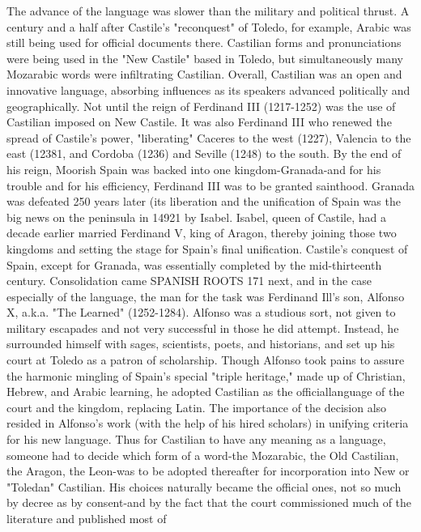 The advance of the language was slower than the military and
political thrust. A century and a half after Castile's "reconquest" of Toledo, for example, Arabic was still being used for official documents
there. Castilian forms and pronunciations were being used in the "New
Castile" based in Toledo, but simultaneously many Mozarabic words
were infiltrating Castilian. Overall, Castilian was an open and innovative language, absorbing influences as its speakers advanced politically
and geographically.
Not until the reign of Ferdinand III (1217-1252) was the use
of Castilian imposed on New Castile. It was also Ferdinand III who renewed the spread of Castile's power, "liberating" Caceres to the west
(1227), Valencia to the east (12381, and Cordoba (1236) and Seville
(1248) to the south. By the end of his reign, Moorish Spain was backed
into one kingdom-Granada-and for his trouble and for his efficiency,
Ferdinand III was to be granted sainthood. Granada was defeated 250
years later (its liberation and the unification of Spain was the big news
on the peninsula in 14921 by Isabel. Isabel, queen of Castile, had a decade earlier married Ferdinand V, king of Aragon, thereby joining those
two kingdoms and setting the stage for Spain's final unification.
Castile's conquest of Spain, except for Granada, was essentially completed by the mid-thirteenth century. Consolidation came
SPANISH ROOTS 171
next, and in the case especially of the language, the man for the task
was Ferdinand Ill's son, Alfonso X, a.k.a. "The Learned" (1252-1284).
Alfonso was a studious sort, not given to military escapades and not
very successful in those he did attempt. Instead, he surrounded himself
with sages, scientists, poets, and historians, and set up his court at Toledo as a patron of scholarship. Though Alfonso took pains to assure
the harmonic mingling of Spain's special "triple heritage," made up of
Christian, Hebrew, and Arabic learning, he adopted Castilian as the officiallanguage of the court and the kingdom, replacing Latin.
The importance of the decision also resided in Alfonso's work
(with the help of his hired scholars) in unifying criteria for his new language. Thus for Castilian to have any meaning as a language, someone
had to decide which form of a word-the Mozarabic, the Old Castilian,
the Aragon, the Leon-was to be adopted thereafter for incorporation
into New or "Toledan" Castilian. His choices naturally became the official ones, not so much by decree as by consent-and by the fact that
the court commissioned much of the literature and published most of
